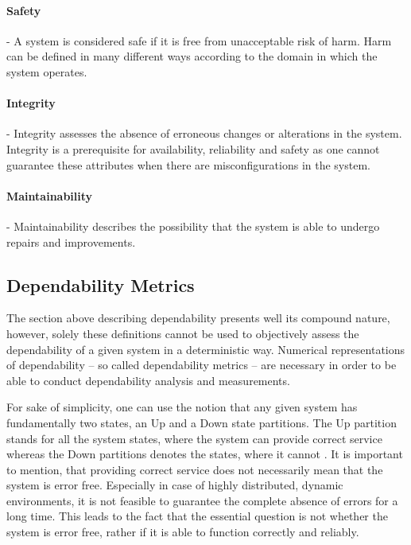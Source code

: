 \paragraph{Safety} - A system is considered safe if it is free from unacceptable risk of harm. Harm can be defined in many different ways according to the domain in which the system operates.

\paragraph{Integrity} - Integrity assesses the absence of erroneous changes or alterations in the system. Integrity is a prerequisite for availability, reliability and safety as one cannot guarantee these attributes when there are misconfigurations in the system.

\paragraph{Maintainability} - Maintainability describes the possibility that the system is able to undergo repairs and improvements.


\subsection{Dependability Metrics}

The section above describing dependability presents well its compound nature, however, solely these definitions cannot be used to objectively assess the dependability of a given system in a deterministic way. Numerical representations of dependability -- so called dependability metrics -- are necessary in order to be able to conduct dependability analysis and measurements.

For sake of simplicity, one can use the notion that any given system has fundamentally two states, an Up and a Down state partitions. The Up partition stands for all the system states, where the system can provide correct service whereas the Down partitions denotes the states, where it cannot \cite{DependabilityBMEMIT}. It is important to mention, that providing correct service does not necessarily mean that the system is error free. Especially in case of highly distributed, dynamic environments, it is not feasible to guarantee the complete absence of errors for a long time. This leads to the fact that the essential question is not whether the system is error free, rather if it is able to function correctly and reliably.

